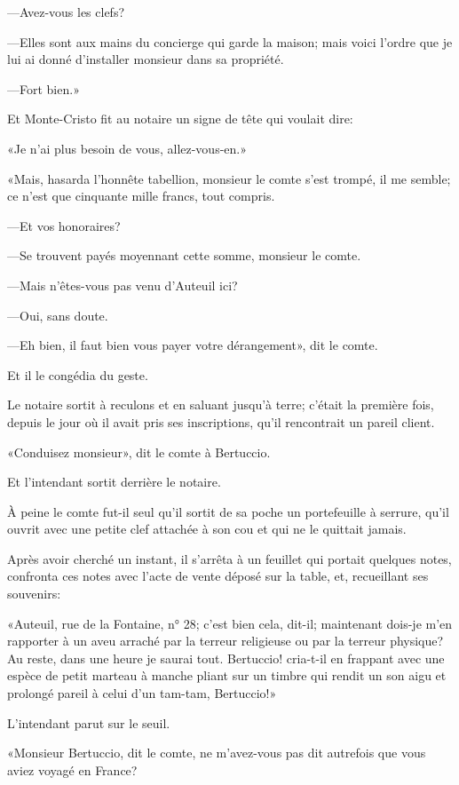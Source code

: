—Avez-vous les clefs? 

—Elles sont aux mains du concierge qui garde la maison; mais voici l'ordre que je lui ai donné d'installer monsieur dans sa propriété.  

—Fort bien.» 

Et Monte-Cristo fit au notaire un signe de tête qui voulait dire: 

«Je n'ai plus besoin de vous, allez-vous-en.» 

«Mais, hasarda l'honnête tabellion, monsieur le comte s'est trompé, il me semble; ce n'est que cinquante mille francs, tout compris. 

—Et vos honoraires? 

—Se trouvent payés moyennant cette somme, monsieur le comte. 

—Mais n'êtes-vous pas venu d'Auteuil ici? 

—Oui, sans doute. 

—Eh bien, il faut bien vous payer votre dérangement», dit le comte. 

Et il le congédia du geste. 

Le notaire sortit à reculons et en saluant jusqu'à terre; c'était la première fois, depuis le jour où il avait pris ses inscriptions, qu'il rencontrait un pareil client. 

«Conduisez monsieur», dit le comte à Bertuccio. 

Et l'intendant sortit derrière le notaire. 

À peine le comte fut-il seul qu'il sortit de sa poche un portefeuille à serrure, qu'il ouvrit avec une petite clef attachée à son cou et qui ne le quittait jamais. 

Après avoir cherché un instant, il s'arrêta à un feuillet qui portait quelques notes, confronta ces notes avec l'acte de vente déposé sur la table, et, recueillant ses souvenirs: 

«Auteuil, rue de la Fontaine, n° 28; c'est bien cela, dit-il; maintenant dois-je m'en rapporter à un aveu arraché par la terreur religieuse ou par la terreur physique? Au reste, dans une heure je saurai tout. Bertuccio! cria-t-il en frappant avec une espèce de petit marteau à manche pliant sur un timbre qui rendit un son aigu et prolongé pareil à celui d'un tam-tam, Bertuccio!» 

L'intendant parut sur le seuil. 

«Monsieur Bertuccio, dit le comte, ne m'avez-vous pas dit autrefois que vous aviez voyagé en France? 

